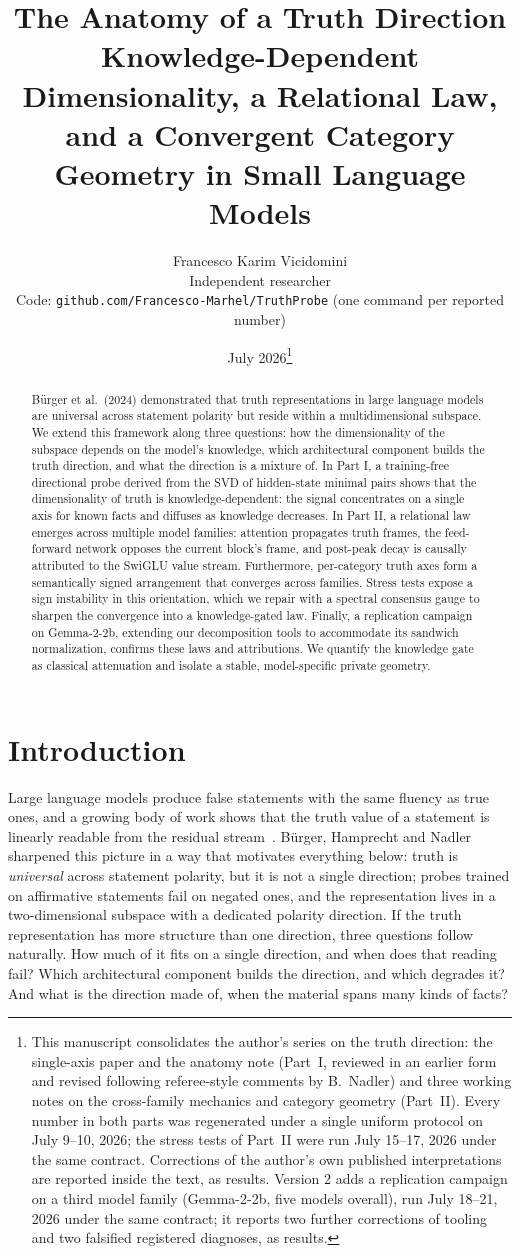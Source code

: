 \documentclass[11pt]{article}
\title{\textbf{The Anatomy of a Truth Direction}\\[2pt]
\large Knowledge-Dependent Dimensionality, a Relational Law,\\
and a Convergent Category Geometry in Small Language Models}
\author{Francesco Karim Vicidomini\\
\small Independent researcher\\
\small Code: \texttt{github.com/Francesco-Marhel/TruthProbe} (one command per reported number)}
\date{July 2026\thanks{This manuscript consolidates the author's series on the
truth direction: the single-axis paper and the anatomy note (Part~I, reviewed
in an earlier form and revised following referee-style comments by B.~Nadler)
and three working notes on the cross-family mechanics and category geometry
(Part~II). Every number in both parts was regenerated under a single uniform
protocol on July 9--10, 2026; the stress tests of Part~II were run
July 15--17, 2026 under the same contract. Corrections of the author's own published
interpretations are reported inside the text, as results. Version 2 adds a
replication campaign on a third model family (Gemma-2-2b, five models
overall), run July 18--21, 2026 under the same contract; it reports two
further corrections of tooling and two falsified registered diagnoses, as
results.}}
\begin{document}
\maketitle

\begin{abstract}
B\"urger et al.\ (2024) demonstrated that truth representations in large language models are universal across statement polarity but reside within a multidimensional subspace. We extend this framework along three questions: how the dimensionality of the subspace depends on the model’s knowledge, which architectural component builds the truth direction, and what the direction is a mixture of. In Part I, a training-free directional probe derived from the SVD of hidden-state minimal pairs shows that the dimensionality of truth is knowledge-dependent: the signal concentrates on a single axis for known facts and diffuses as knowledge decreases. In Part II, a relational law emerges across multiple model families: attention propagates truth frames, the feed-forward network opposes the current block's frame, and post-peak decay is causally attributed to the SwiGLU value stream. Furthermore, per-category truth axes form a semantically signed arrangement that converges across families. Stress tests expose a sign instability in this orientation, which we repair with a spectral consensus gauge to sharpen the convergence into a knowledge-gated law. Finally, a replication campaign on Gemma-2-2b, extending our decomposition tools to accommodate its sandwich normalization, confirms these laws and attributions. We quantify the knowledge gate as classical attenuation and isolate a stable, model-specific private geometry.
\end{abstract}

\section{Introduction}

Large language models produce false statements with the same fluency as
true ones, and a growing body of work shows that the truth value of a
statement is linearly readable from the residual
stream~\cite{burns2023,marks2024,li2023,zou2023}. B\"urger, Hamprecht and
Nadler~\cite{burger2024} sharpened this picture in a way that motivates
everything below: truth is \emph{universal} across statement polarity, but
it is not a single direction; probes trained on affirmative statements fail
on negated ones, and the representation lives in a two-dimensional subspace
with a dedicated polarity direction. If the truth representation has more
structure than one direction, three questions follow naturally. How much of
it fits on a single direction, and when does that reading fail? Which
architectural component builds the direction, and which degrades it? And
what is the direction made of, when the material spans many kinds of facts?
\end{document}
